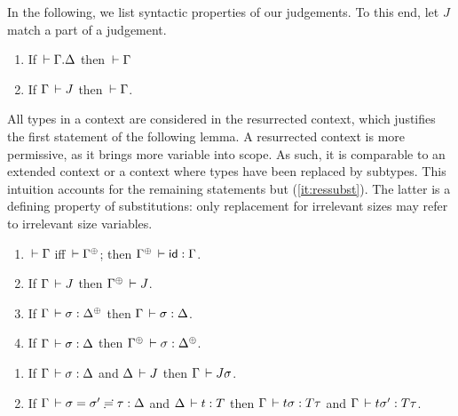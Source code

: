 \documentclass[acmlarge,review,anonymous]{acmart}\settopmatter{printfolios=true}
\begin{document}

In the following, we list syntactic properties of our judgements.  To
this end, let $J$ %
match a part of a judgement.

\begin{lemma}
\label{lem:cxtwf}\bla
  \begin{enumerate}
  \item If\/ $\,\vdash \Gamma. \Delta$ then $\,\vdash \Gamma$
  \item If\/ $\Gamma \,\vdash J$ then $\,\vdash \Gamma$.
  \end{enumerate}
\end{lemma}

All types in a context are considered in the resurrected context,
which justifies the first statement of the following lemma.
A resurrected context is more permissive, as it brings more variable
into scope.  As such, it is comparable to an extended context or a
context where types have been replaced by subtypes.  This intuition
accounts for the remaining statements but (\ref{it:ressubst}).  The
latter is a defining property of substitutions: only replacement for
irrelevant sizes may refer to irrelevant size variables.
\begin{lemma}[Resurrection]
\label{lem:res} \bla
\begin{enumerate}
\item \label{it:reswf} $\,\vdash \Gamma$ iff $\der \resurrect\Gamma$;  then $\resurrect \Gamma \der \sid : \Gamma$.
\item If\/ $\Gamma \,\vdash J$ then $\resurrect \Gamma \der J$.
\item If\/ $\Gamma \der \sigma : \resurrect \Delta$ %
  then $\Gamma \,\vdash \sigma : \Delta$.
\item \label{it:ressubst} If\/ $\Gamma \,\vdash \sigma : \Delta$ %
  then $\resurrect\Gamma \der \sigma : \resurrect\Delta$.
\end{enumerate}
\end{lemma}

\begin{lemma}[Substitution]
\label{lem:sub}\bla
\begin{enumerate}
\item
  If\/ $\Gamma \,\vdash \sigma : \Delta$ and $\Delta \,\vdash J$ then $\Gamma \,\vdash J\sigma$.
\item
  If\/ $\Gamma \,\vdash \sigma = \sigma' \risingdotseq \tau : \Delta$ and $\Delta \,\vdash t : T$ then
  $\Gamma \,\vdash t\sigma : T\tau$ and $\Gamma \,\vdash t\sigma' : T\tau$.
\end{enumerate}
\end{lemma}
\end{document}
